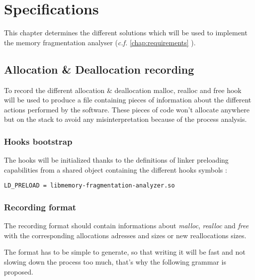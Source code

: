 \chapter{Specifications}
This chapter determines the different solutions which will be used to implement the memory fragmentation analyser (\emph{c.f.} \ref{chap:requirements} ).

\section{Allocation \& Deallocation recording}
To record the different allocation \& deallocation malloc, realloc and free hook will be used to produce a file containing pieces of information about the different actions performed by the software. These pieces of code won't allocate anywhere but on the stack to avoid any misinterpretation because of the process analysis.

\subsection{Hooks bootstrap}
The hooks will be initialized thanks to the definitions of linker preloading capabilities from a shared object containing the different hooks symbols :
\begin{verbatim}
LD_PRELOAD = libmemory-fragmentation-analyzer.so
\end{verbatim}

\subsection{Recording format}
The recording format should contain informations about \emph{malloc}, \emph{realloc} and \emph{free} with the corresponding allocations adresses and sizes or new reallocations sizes.

The format has to be simple to generate, so that writing it will be fast and not slowing down the process too much, that's why the following grammar is proposed.

